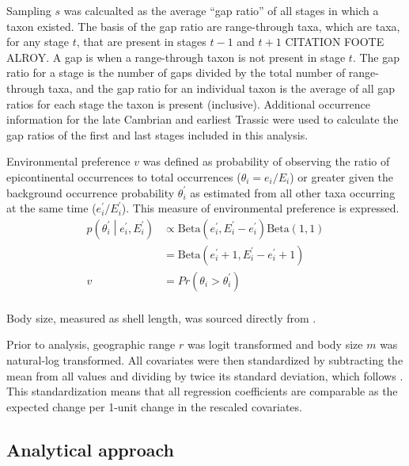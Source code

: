 \documentclass{article}
\begin{document}
Sampling \(s\) was calcualted as the average ``gap ratio'' of all stages in which a taxon existed. The basis of the gap ratio are range-through taxa, which are taxa, for any stage \(t\), that are present in stages \(t-1\) and \(t+1\) CITATION FOOTE ALROY. A gap is when a range-through taxon is not present in stage \(t\). The gap ratio for a stage is the number of gaps divided by the total number of range-through taxa, and the gap ratio for an individual taxon is the average of all gap ratios for each stage the taxon is present (inclusive). Additional occurrence information for the late Cambrian and earliest Trassic were used to calculate the gap ratios of the first and last stages included in this analysis. 

Environmental preference \(v\) was defined as probability of observing the ratio of epicontinental occurrences to total occurrences (\(\theta_{i} = e_{i} / E_{i}\)) or greater given the background occurrence probability \(\theta^{\prime}_{i}\) as estimated from all other taxa occurring at the same time (\(e^{\prime}_{i} / E^{\prime}_{i}\)). This measure of environmental preference is expressed.
\begin{equation}
  \begin{aligned}
    p\left(\theta^{\prime}_{i} \middle| e^{\prime}_{i}, E^{\prime}_{i} \right) &\propto \mathrm{Beta}(e^{\prime}_{i}, E^{\prime}_{i} - e^{\prime}_{i}) \mathrm{Beta}(1, 1) \\
    &= \mathrm{Beta}(e^{\prime}_{i} + 1, E^{\prime}_{i} - e^{\prime}_{i} + 1) \\
    v &= Pr(\theta_{i} > \theta^{\prime}_{i}) \\
  \end{aligned}
  \label{eq:envpref}
\end{equation}

Body size, measured as shell length, was sourced directly from \citet{Payne2014}.

Prior to analysis, geographic range \(r\) was logit transformed and body size \(m\) was natural-log transformed. All covariates were then standardized by subtracting the mean from all values and dividing by twice its standard deviation, which follows \citet{Gelman2007}. This standardization means that all regression coefficients are comparable as the expected change per 1-unit change in the rescaled covariates. 


\subsection{Analytical approach}
\end{document}
